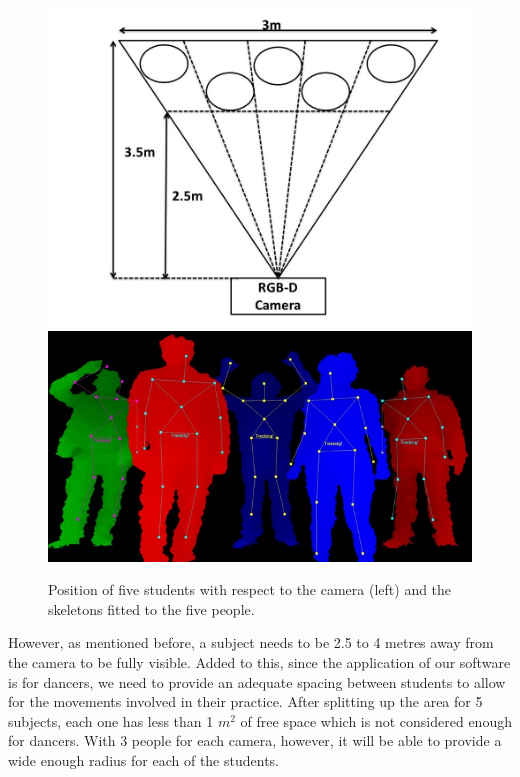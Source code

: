 \documentclass[11pt,a4paper]{article}
\begin{document}
\begin{figure}[H]
\centering
\includegraphics[scale=0.25]{multi_people1.jpg}
\includegraphics[scale=0.6]{multi_people2.jpg}
\caption{Position of five students with respect to the camera (left) and the skeletons fitted to the five people.}
\label{people_pos}
\end{figure}
\noindent
However, as mentioned before, a subject needs to be 2.5 to 4 metres away from the camera to be fully visible. Added to this, since the application of our software is for dancers, we need to provide an adequate spacing between students to allow for the movements involved in their practice. After splitting up the area for 5 subjects, each one has less than 1 $m^2$ of free space which is not considered enough for dancers. With 3 people for each camera, however, it will be able to provide a wide enough radius for each of the students.
\end{document}
